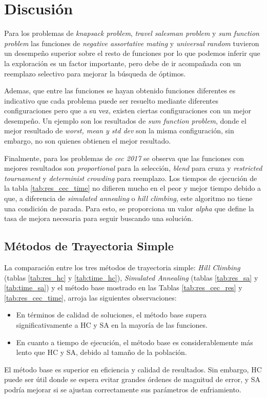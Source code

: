 \section{Discusión}

Para los problemas de \textit{knapsack problem}, \textit{travel salesman problem} y \textit{sum function problem} las funciones de \textit{negative assortative mating} y \textit{universal random} tuvieron un desempeño superior sobre el resto de funciones por lo que podemos inferir que la exploración es un factor importante, pero debe de ir acompañada con un reemplazo selectivo para mejorar la búsqueda de óptimos.

Ademas, que entre las funciones se hayan obtenido funciones diferentes es indicativo que cada problema puede ser resuelto mediante diferentes configuraciones pero que a su vez, existen ciertas configuraciones con un mejor desempeño. Un ejemplo son los resultados de \textit{sum function problem}, donde el mejor resultado de \textit{worst, mean y std dev} son la misma configuración, sin embargo, no son quienes obtienen el mejor resultado.

Finalmente, para los problemas de \textit{cec 2017} se observa que las funciones con mejores resultados son \textit{proportional} para la selección, \textit{blend} para cruza y \textit{restricted tournament} y \textit{determinist crowding} para reemplazo. Los tiempos de ejecución de la tabla \ref{tab:res_cec_time} no difieren mucho en el peor y mejor tiempo debido a que, a diferencia de \textit{simulated annealing} o \textit{hill climbing}, este algoritmo no tiene una condición de parada. Para esto, se proporciona un valor \textit{alpha} que define la tasa de mejora necesaria para seguir buscando una solución.

\subsection{Métodos de Trayectoria Simple}

La comparación entre los tres métodos de trayectoria simple: \textit{Hill Climbing} (tablas \ref{tab:res_hc} y \ref{tab:time_hc}), \textit{Simulated Annealing} (tablas \ref{tab:res_sa} y \ref{tab:time_sa}) y el método base mostrado en las Tablas \ref{tab:res_cec_res} y \ref{tab:res_cec_time}, arroja las siguientes observaciones:

\begin{itemize}
	\item En términos de calidad de soluciones, el método base supera significativamente a HC y SA en la mayoría de las funciones.
	\item En cuanto a tiempo de ejecución, el método base es considerablemente más lento que HC y SA, debido al tamaño de la población.
\end{itemize}

El método base es superior en eficiencia y calidad de resultados. Sin embargo, HC puede ser útil donde se espera evitar grandes órdenes de magnitud de error, y SA podría mejorar si se ajustan correctamente sus parámetros de enfriamiento.

